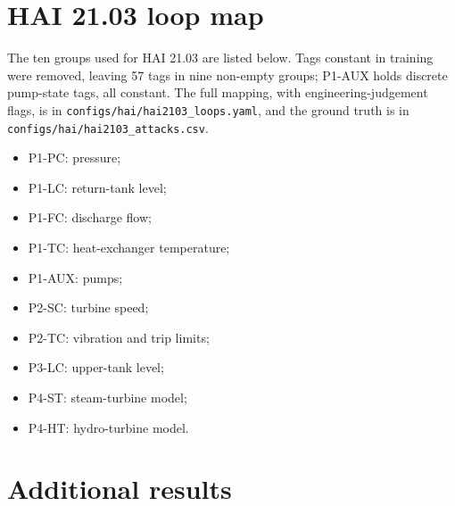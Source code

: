 \section{HAI 21.03 loop map}\label{app:loops}
The ten groups used for HAI 21.03 are listed below. Tags constant in training were removed, leaving 57 tags in nine non-empty groups; P1-AUX holds discrete pump-state tags, all constant. The full mapping, with engineering-judgement flags, is in \texttt{configs/hai/hai2103\_loops.yaml}, and the ground truth is in \texttt{configs/hai/hai2103\_attacks.csv}.
\begin{itemize}
\item P1-PC: pressure;
\item P1-LC: return-tank level;
\item P1-FC: discharge flow;
\item P1-TC: heat-exchanger temperature;
\item P1-AUX: pumps;
\item P2-SC: turbine speed;
\item P2-TC: vibration and trip limits;
\item P3-LC: upper-tank level;
\item P4-ST: steam-turbine model;
\item P4-HT: hydro-turbine model.
\end{itemize}

\section{Additional results}\label{app:extra}



